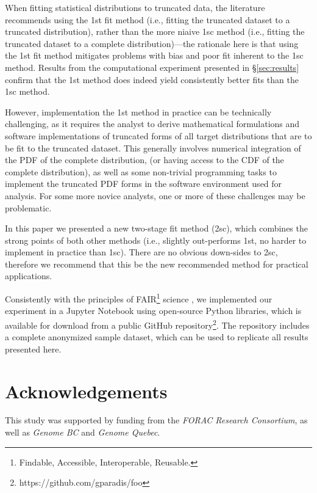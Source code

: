 \documentclass{article}
\begin{document}
  When fitting statistical distributions to truncated data, the literature recommends using the 1st fit method (i.e., fitting the truncated dataset to a truncated distribution), rather than the more niaive 1sc method (i.e., fitting the truncated dataset to a complete distribution)---the rationale here is that using the 1st fit method mitigates problems with bias and poor fit inherent to the 1sc method.
  Results from the computational experiment presented in \S\ref{sec:results} confirm that the 1st method does indeed yield consistently better fits than the 1sc method.

  However, implementation the 1st method in practice can be technically challenging, as it requires the analyst to derive mathematical formulations and software implementations of truncated forms of all target distributions that are to be fit to the truncated dataset. This generally involves numerical integration of the PDF of the complete distribution, (or having access to the CDF of the complete distribution), as well as some non-trivial programming tasks to implement the truncated PDF forms in the software environment used for analysis.
  For some more novice analysts, one or more of these challenges may be problematic.

  In this paper we presented a new two-stage fit method (2sc), which combines the strong points of both other methods (i.e., slightly out-performs 1st, no harder to implement in practice than 1sc).
  There are no obvious down-sides to 2sc, therefore we recommend that this be the new recommended method for practical applications.

  Consistently with the principles of FAIR\footnote{Findable, Accessible, Interoperable, Reusable.} science \citep{stall2019make, wilkinson2016fair}, we implemented our experiment in a Jupyter Notebook using open-source Python libraries, which is available for download from a public GitHub repository\footnote{https://github.com/gparadis/foo}.  The repository includes a complete anonymized sample dataset, which can be used to replicate all results presented here.
  
\section{Acknowledgements}

This study was supported by funding from the \emph{FORAC Research Consortium}, as well as \emph{Genome BC} and \emph{Genome Quebec}.

\begin{nolinenumbers}


\end{nolinenumbers}
\end{document}
